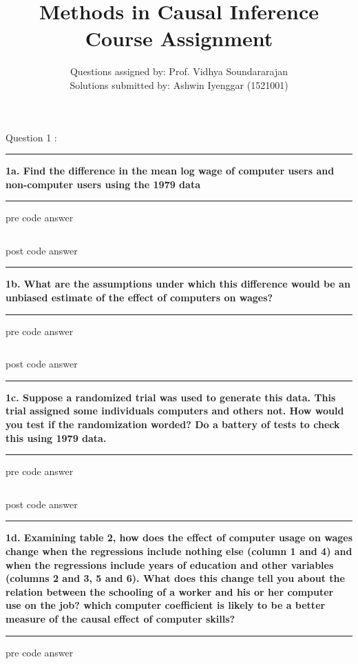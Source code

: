 \documentclass[12pt]{article}
\newcommand\question[1]{\vspace{1em}\hrule\vspace{1em}\textbf{#1}\vspace{1em}\hrule\vspace{1em}}
\begin{document}
\title{Methods in Causal Inference Course Assignment}
\author{Questions assigned by: Prof. Vidhya Soundararajan\\ Solutions submitted by: Ashwin Iyenggar  (1521001)} 


\maketitle
\thispagestyle{empty}


\begin{center}\LARGE{Question 1 : \cite{Dinardo1997}}\end{center}
\question{1a. Find the difference in the mean log wage of computer users and non-computer users using the 1979 data}
pre code answer

\begin{lstlisting}
\end{lstlisting}

post code answer

\newpage
\question{1b. What are the assumptions under which this difference would be an unbiased estimate of the effect of computers on wages?}
pre code answer

\begin{lstlisting}
\end{lstlisting}

post code answer

\newpage
\question{1c. Suppose a randomized trial was used to generate this data. This trial assigned some individuals computers and others not. How would you test if the randomization worded? Do a battery of tests to check this using 1979 data.}
pre code answer

\begin{lstlisting}
\end{lstlisting}

post code answer

\newpage
\question{1d. Examining \cite{Krueger1993} table 2, how does the effect of computer usage on wages change when the regressions include nothing else (column 1 and 4) and when the regressions include years of education and other variables (columns 2 and 3, 5 and 6). What does this change tell you about the relation between the schooling of a worker and his or her computer use on the job? which computer coefficient is likely to be a better measure of the causal effect of computer skills?}
pre code answer

\begin{lstlisting}
\end{lstlisting}
\end{document}
